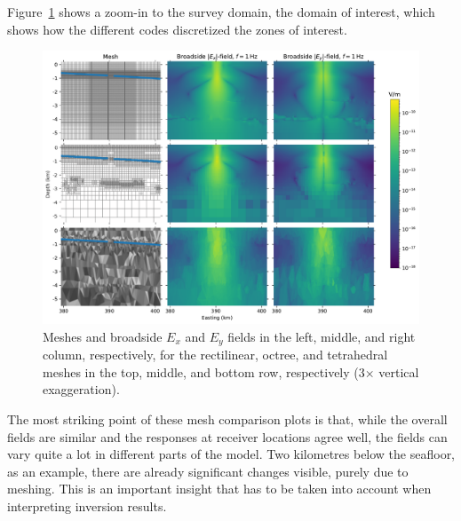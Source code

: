 \documentclass[onecolumn,extra,camera]{gji}
\begin{document}
Figure~\ref{fig:results-marlim_survey} shows a zoom-in to the survey domain, the domain of interest, which shows how the different codes discretized the zones of interest.
%
\begin{figure}
  \centering
  \includegraphics[width=.9\linewidth]{figures/results-marlim_survey}
  \caption{Meshes and broadside $E_x$ and $E_y$ fields in the left, middle, and right column, respectively, for the rectilinear, octree, and tetrahedral meshes in the top, middle, and bottom row, respectively (3$\times$ vertical exaggeration).}
  \label{fig:results-marlim_survey}
\end{figure}
%
The most striking point of these mesh comparison plots is that, while the overall fields are similar and the responses at receiver locations agree well, the fields can vary quite a lot in different parts of the model. Two kilometres below the seafloor, as an example, there are already significant changes visible, purely due to meshing. This is an important insight that has to be taken into account when interpreting inversion results.
\end{document}

